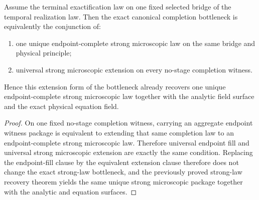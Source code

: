 \begin{theorem}
\label{thm:canonical-completion-bottleneck-iff-canonical-strong-microscopic-law-plus-universal-extension}
Assume the terminal exactification law on one fixed selected bridge of the
temporal realization law. Then the exact canonical completion bottleneck is
equivalently the conjunction of:
\begin{enumerate}
\item one unique endpoint-complete strong microscopic law on the same bridge
and physical principle;
\item universal strong microscopic extension on every no-stage
      completion witness.
\end{enumerate}
Hence this extension form of the bottleneck already recovers one unique
endpoint-complete strong microscopic law together with the analytic field
surface and the exact physical equation field.
\end{theorem}

\begin{proof}
On one fixed no-stage completion witness, carrying an aggregate endpoint
witness package is equivalent to extending that same completion law to an
endpoint-complete strong microscopic law. Therefore universal endpoint fill and
universal strong microscopic extension are exactly the same
condition. Replacing the endpoint-fill clause by the equivalent extension
clause therefore does not change the exact strong-law bottleneck, and the
previously proved strong-law recovery theorem yields the same unique strong
microscopic package together with the analytic and equation surfaces.
\end{proof}

